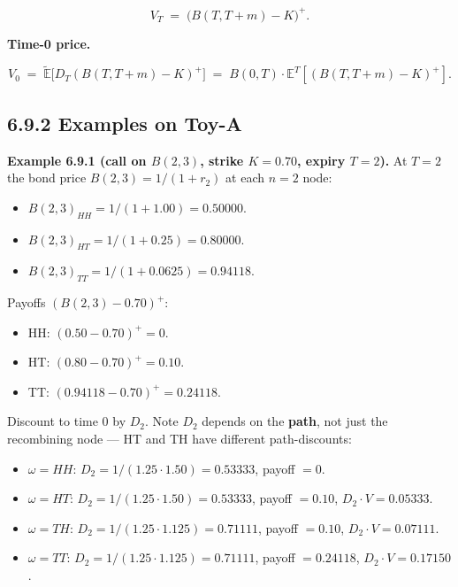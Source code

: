 \documentclass[
  10pt,
  twoside]{book}
\providecommand{\tightlist}{%
  \setlength{\itemsep}{0pt}\setlength{\parskip}{0pt}}
\begin{document}
\[V_T \;=\; \bigl(B(T, T+m) - K\bigr)^+.\]

\textbf{Time-0 price.}

\[V_0 \;=\; \tilde{\mathbb E}\bigl[D_T (B(T, T+m) - K)^+\bigr] \;=\; B(0, T) \cdot \mathbb E^T[(B(T, T+m) - K)^+].\]

\subsection{6.9.2 Examples on Toy-A}\label{examples-on-toy-a-4}

\textbf{Example 6.9.1 (call on \(B(2, 3)\), strike \(K = 0.70\), expiry
\(T = 2\)).} At \(T = 2\) the bond price \(B(2, 3) = 1/(1 + r_2)\) at
each \(n = 2\) node:

\begin{itemize}
\tightlist
\item
  \(B(2, 3)_{HH} = 1/(1 + 1.00) = 0.50000\).
\item
  \(B(2, 3)_{HT} = 1/(1 + 0.25) = 0.80000\).
\item
  \(B(2, 3)_{TT} = 1/(1 + 0.0625) = 0.94118\).
\end{itemize}

Payoffs \((B(2, 3) - 0.70)^+\):

\begin{itemize}
\tightlist
\item
  HH: \((0.50 - 0.70)^+ = 0\).
\item
  HT: \((0.80 - 0.70)^+ = 0.10\).
\item
  TT: \((0.94118 - 0.70)^+ = 0.24118\).
\end{itemize}

Discount to time 0 by \(D_2\). Note \(D_2\) depends on the
\textbf{path}, not just the recombining node --- HT and TH have
different path-discounts:

\begin{itemize}
\tightlist
\item
  \(\omega = HH\): \(D_2 = 1/(1.25 \cdot 1.50) = 0.53333\), payoff
  \(= 0\).
\item
  \(\omega = HT\): \(D_2 = 1/(1.25 \cdot 1.50) = 0.53333\), payoff
  \(= 0.10\), \(D_2 \cdot V = 0.05333\).
\item
  \(\omega = TH\): \(D_2 = 1/(1.25 \cdot 1.125) = 0.71111\), payoff
  \(= 0.10\), \(D_2 \cdot V = 0.07111\).
\item
  \(\omega = TT\): \(D_2 = 1/(1.25 \cdot 1.125) = 0.71111\), payoff
  \(= 0.24118\), \(D_2 \cdot V = 0.17150\).
\end{itemize}
\end{document}
